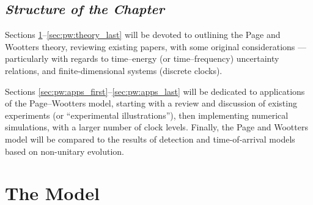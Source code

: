 \subsection*{\it Structure of the Chapter}

Sections \ref{sec:pw:theory_first}--\ref{sec:pw:theory_last}
will be devoted to outlining the Page and Wootters theory, reviewing existing papers,
with some original considerations ---particularly with regards to
time--energy (or time--frequency) uncertainty relations, and
finite-dimensional systems (discrete clocks).

Sections \ref{sec:pw:apps_first}--\ref{sec:pw:apps_last} will be dedicated to
applications of the Page--Wootters model, starting with a review and discussion of existing
experiments (or ``experimental illustrations''),
then implementing numerical simulations, with a larger number of clock levels.
Finally, the Page and Wootters model will be compared to the results of
detection and time-of-arrival models
based on non-unitary evolution.

\section{The Model}\label{sec:pw:theory_first}


